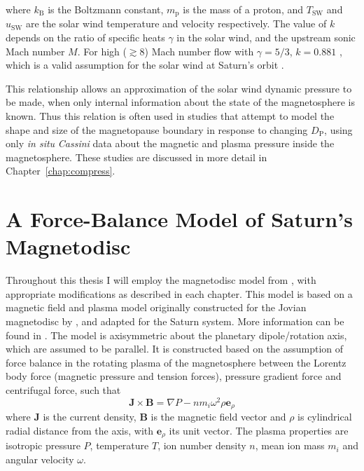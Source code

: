 {where $k_\mathrm{B}$ is the Boltzmann constant,  $m_\mathrm{p}$ is the mass of a proton, and $T_\mathrm{SW}$ and $u_\mathrm{SW}$ are the solar wind temperature and velocity respectively. The value of $k$ depends on the ratio of specific heats $\gamma$ in the solar wind, and the upstream sonic Mach number $M$. For high (${\gtrsim}8$) Mach number flow with $\gamma = 5/3$, $k = 0.881$ \citep{spreiter1966}, which is a valid assumption for the solar wind at Saturn's orbit \cite[e.g.][]{slavin1985,achilleos2006}.

This relationship allows an approximation of the solar wind dynamic pressure to be made, when only internal information about the state of the magnetosphere is known. 
Thus this relation is often used in studies that attempt to model the shape and size of the magnetopause boundary in response to changing $D_\mathrm{P}$, using only \textit{in situ} \textit{Cassini} data about the magnetic and plasma pressure inside the magnetosphere. These studies are discussed in more detail in Chapter~\ref{chap:compress}.

\section{A Force-Balance Model of Saturn's Magnetodisc}
Throughout this thesis I will employ the magnetodisc model from \citet{achilleos2010a}, with appropriate modifications as described in each chapter. This model is based on  a magnetic field and plasma model originally constructed for the Jovian magnetodisc by \citet{caudal1986}, and adapted for the Saturn system. More information can be found in \citet{achilleos2010a, achilleos2010b}. The model is axisymmetric about the planetary dipole/rotation axis, which are assumed to be parallel. It is constructed based on the assumption of force balance in the rotating plasma of the magnetosphere between the Lorentz body force (magnetic pressure and tension forces), pressure gradient force and centrifugal force, such that 
\begin{equation}\label{intro:eq:forcebalance}
\boldsymbol{J} \times \boldsymbol{B} = \nabla P - nm_i\omega^2\rho\boldsymbol{e}_\rho
\end{equation}
where $\boldsymbol{J}$ is the current density, $\boldsymbol{B}$ is the magnetic field vector and $\rho$ is cylindrical radial distance from the axis, with $\boldsymbol{e}_\rho$ its unit vector. The plasma properties are isotropic pressure $P$, temperature $T$, ion number density $n$, mean ion mass $m_i$ and angular velocity $\omega$.

}
